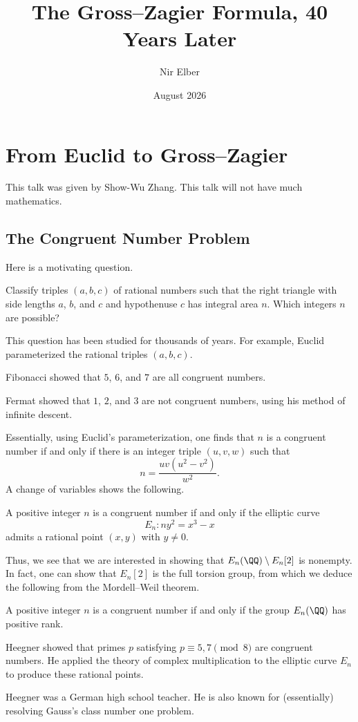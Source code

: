 \documentclass{article}
\title{The Gross--Zagier Formula, 40 Years Later}
\author{Nir Elber}
\date{August 2026}
\begin{document}
\maketitle

\tableofcontents

\section{From Euclid to Gross--Zagier}
This talk was given by Show-Wu Zhang. This talk will not have much mathematics.

\subsection{The Congruent Number Problem}
Here is a motivating question.
\begin{ques}
	Classify triples $(a,b,c)$ of rational numbers such that the right triangle with side lengths $a$, $b$, and $c$ and hypothenuse $c$ has integral area $n$. Which integers $n$ are possible?
\end{ques}
This question has been studied for thousands of years. For example, Euclid parameterized the rational triples $(a,b,c)$.
\begin{example}
	Fibonacci showed that $5$, $6$, and $7$ are all congruent numbers.
\end{example}
\begin{example}
	Fermat showed that $1$, $2$, and $3$ are not congruent numbers, using his method of infinite descent.
\end{example}
Essentially, using Euclid's parameterization, one finds that $n$ is a congruent number if and only if there is an integer triple $(u,v,w)$ such that
\[n=\frac{uv\left(u^2-v^2\right)}{w^2}.\]
A change of variables shows the following.
\begin{lemma}
	A positive integer $n$ is a congruent number if and only if the elliptic curve
	\[E_n\colon ny^2=x^3-x\]
	admits a rational point $(x,y)$ with $y\ne0$.
\end{lemma}
Thus, we see that we are interested in showing that $E_n(\QQ)\setminus E_n[2]$ is nonempty. In fact, one can show that $E_n[2]$ is the full torsion group, from which we deduce the following from the Mordell--Weil theorem.
\begin{proposition}
	A positive integer $n$ is a congruent number if and only if the group $E_n(\QQ)$ has positive rank.
\end{proposition}
\begin{example}
	Heegner showed that primes $p$ satisfying $p\equiv5,7\pmod8$ are congruent numbers. He applied the theory of complex multiplication to the elliptic curve $E_n$ to produce these rational points.
\end{example}
\begin{remark}
	Heegner was a German high school teacher. He is also known for (essentially) resolving Gauss's class number one problem.
\end{remark}
\end{document}
